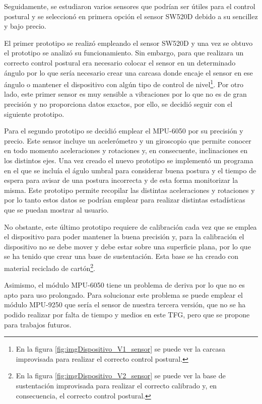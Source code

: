 Seguidamente, se estudiaron varios sensores que podrían ser útiles para el control postural y se seleccionó en primera opción el sensor SW520D debido a su sencillez y bajo precio.

El primer prototipo se realizó empleando el sensor SW520D y una vez se obtuvo el prototipo se analizó su funcionamiento. Sin embargo, para que realizara un correcto control postural era necesario colocar el sensor en un determinado ángulo por lo que sería necesario crear una carcasa donde encaje el sensor en ese ángulo o mantener el dispositivo con algún tipo de control de nivel\footnote{En la figura \ref{fig:imgDispositivo_V1_sensor} se puede ver la carcasa improvisada para realizar el correcto control postural.}. Por otro lado, este primer sensor es muy sensible a vibraciones por lo que no es de gran precisión y no proporciona datos exactos, por ello, se decidió seguir con el siguiente prototipo.

Para el segundo prototipo se decidió emplear el MPU-6050 por su precisión y precio. Este sensor incluye un acelerómetro y un giroscopio que permite conocer en todo momento aceleraciones y rotaciones y, en consecuente, inclinaciones en los distintos ejes. Una vez creado el nuevo prototipo se implementó un programa en el que se incluía el águlo umbral para considerar buena postura y el tiempo de espera para avisar de una postura incorrecta y de esta forma monitorizar la misma. Este prototipo permite recopilar las distintas aceleraciones y rotaciones y por lo tanto estos datos se podrían emplear para realizar distintas estadísticas que se puedan mostrar al usuario.

No obstante, este último prototipo requiere de calibración cada vez que se emplea el dispositivo para poder mantener la buena precisión y, para la calibración el dispositivo no se debe mover y debe estar sobre una superficie plana, por lo que se ha tenido que crear una base de sustentación. Esta base se ha creado con material reciclado de cartón\footnote{En la figura \ref{fig:imgDispositivo_V2_sensor} se puede ver la base de sustentación improvisada para realizar el correcto calibrado y, en consecuencia, el correcto control postural.}.

Asimismo, el módulo MPU-6050 tiene un problema de deriva por lo que no es apto para uso prolongado. Para solucionar este problema se puede emplear el módulo MPU-9250 que sería el sensor de nuestra tercera versión, que no se ha podido realizar por falta de tiempo y medios en este TFG, pero que se propone para trabajos futuros.




